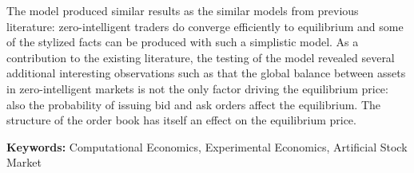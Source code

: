 The model produced similar results as the similar models from previous literature: zero-intelligent
traders do converge efficiently to equilibrium and some of the stylized facts can be produced
with such a simplistic model. As a contribution to the existing literature, the testing of the model 
revealed several additional interesting observations such as that the global balance between assets in 
zero-intelligent markets is not the only factor driving the equilibrium price: also the probability 
of issuing bid and ask orders affect the equilibrium. The structure of the order book has itself 
an effect on the equilibrium price.

\textbf{Keywords:} Computational Economics, Experimental Economics, Artificial Stock Market
